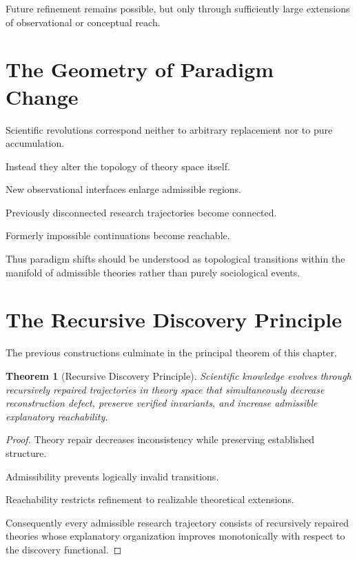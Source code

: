 \documentclass[11pt,oneside]{book}
\numberwithin{equation}{chapter}
\theoremstyle{definition}
\theoremstyle{plain}
\newtheorem{theorem}[definition]{Theorem}
\begin{document}
Future refinement remains possible, but only through sufficiently large
extensions of observational or conceptual reach.

\section{The Geometry of Paradigm Change}

Scientific revolutions correspond neither to arbitrary replacement nor to
pure accumulation.

Instead they alter the topology of theory space itself.

New observational interfaces enlarge admissible regions.

Previously disconnected research trajectories become connected.

Formerly impossible continuations become reachable.

Thus paradigm shifts should be understood as topological transitions within
the manifold of admissible theories rather than purely sociological events.

\section{The Recursive Discovery Principle}

The previous constructions culminate in the principal theorem of this
chapter.

\begin{theorem}[Recursive Discovery Principle]

Scientific knowledge evolves through recursively repaired trajectories in
theory space that simultaneously decrease reconstruction defect, preserve
verified invariants, and increase admissible explanatory reachability.

\end{theorem}

\begin{proof}

Theory repair decreases inconsistency while preserving established
structure.

Admissibility prevents logically invalid transitions.

Reachability restricts refinement to realizable theoretical extensions.

Consequently every admissible research trajectory consists of recursively
repaired theories whose explanatory organization improves monotonically with
respect to the discovery functional.

\end{proof}
\end{document}
